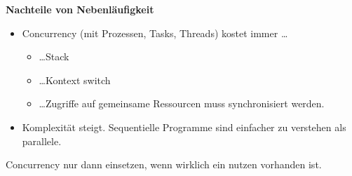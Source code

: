 \textbf{Nachteile von Nebenläufigkeit}
\begin{itemize}
  \item  Concurrency (mit Prozessen, Tasks, Threads) kostet immer \ldots
  \begin{itemize}
    \item \ldots Stack
    \item \ldots Kontext switch
    \item \ldots Zugriffe auf gemeinsame Ressourcen muss synchronisiert werden.
  \end{itemize}
  \item  Komplexität steigt. Sequentielle Programme sind einfacher zu verstehen als parallele.
\end{itemize}
Concurrency nur dann einsetzen, wenn wirklich ein nutzen vorhanden ist.

